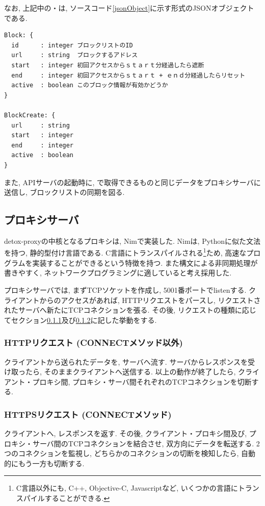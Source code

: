 \documentclass[10pt,a4paper,uplatex,a4j,dvipdfmx]{jsarticle}
\begin{document}
\begin{multicols}{2}
       なお, 上記中の・は, ソースコード\ref{jsonObject}に示す形式のJSONオブジェクトである.

       \begin{lstlisting}[caption=各JSONオブジェクト,label=jsonObject]
Block: {
  id      : integer ブロックリストのID
  url     : string  ブロックするアドレス
  start   : integer 初回アクセスからｓｔａｒｔ分経過したら遮断
  end     : integer 初回アクセスからｓｔａｒｔ + ｅｎｄ分経過したらリセット 
  active  : boolean このブロック情報が有効かどうか
}

BlockCreate: {
  url     : string
  start   : integer
  end     : integer
  active  : boolean
}
      \end{lstlisting}

また, APIサーバの起動時に, で取得できるものと同じデータをプロキシサーバに送信し, ブロックリストの同期を図る.

  \subsection{プロキシサーバ}
    
    detox-proxyの中核となるプロキシは, Nim\cite{nim}で実装した.
    Nimは, Pythonに似た文法を持つ, 静的型付け言語である. C言語にトランスパイルされる\footnote{C言語以外にも, C++, Objective-C, Javascriptなど, いくつかの言語にトランスパイルすることができる.}ため, 高速なプログラムを実装することができるという特徴を持つ. また構文による非同期処理が書きやすく, ネットワークプログラミングに適していると考え採用した.
    
    プロキシサーバでは, まずTCPソケットを作成し, 5001番ポートでlistenする.
    クライアントからのアクセスがあれば, HTTPリクエストをパースし, リクエストされたサーバへ新たにTCPコネクションを張る. その後, リクエストの種類に応じてセクション\ref{sec:proxy:http}及び\ref{sec:proxy:https}に記した挙動をする.
    \subsubsection{HTTPリクエスト (CONNECTメソッド以外)}
    \label{sec:proxy:http}
    クライアントから送られたデータを, サーバへ流す.
    サーバからレスポンスを受け取ったら, そのままクライアントへ送信する.
    以上の動作が終了したら, クライアント・プロキシ間, プロキシ・サーバ間それぞれのTCPコネクションを切断する.
    
    \subsubsection{HTTPSリクエスト (CONNECTメソッド)}
    \label{sec:proxy:https}
    クライアントへ, レスポンスを返す.
    その後, クライアント・プロキシ間及び, プロキシ・サーバ間のTCPコネクションを結合させ, 双方向にデータを転送する.
    2つのコネクションを監視し, どちらかのコネクションの切断を検知したら, 自動的にもう一方も切断する.
    

\end{multicols}
\end{document}
